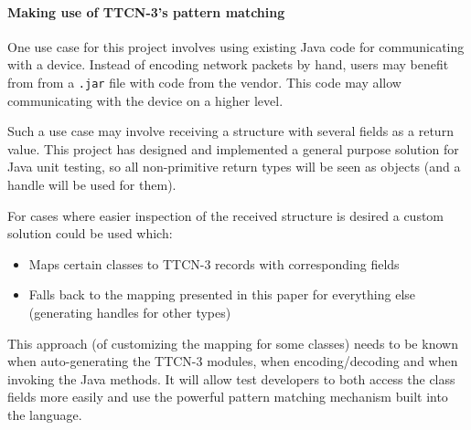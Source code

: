 \paragraph{Making use of \ac{TTCN-3}'s pattern matching}
One use case for this project involves using existing Java code
for communicating with a device.
Instead of encoding network packets by hand,
users may benefit from from a \verb=.jar= file with code from the vendor.
This code may allow communicating with the device on a higher level.

Such a use case may involve receiving a structure with several fields
as a return value.
This project has designed and implemented a general purpose solution
for Java unit testing,
so all non-primitive return types will be seen as objects
(and a handle will be used for them).

For cases where easier inspection of the received structure is desired
a custom solution could be used which:
\begin{itemize}
\item Maps certain classes to \ac{TTCN-3} records with corresponding fields
\item Falls back to the mapping presented in this paper for everything else
(generating handles for other types)
\end{itemize}
This approach (of customizing the mapping for some classes)
needs to be known when auto-generating the \ac{TTCN-3} modules,
when encoding/decoding and when invoking the Java methods.
It will allow test developers to both access the class fields more easily
and use the powerful pattern matching mechanism built into the language.
